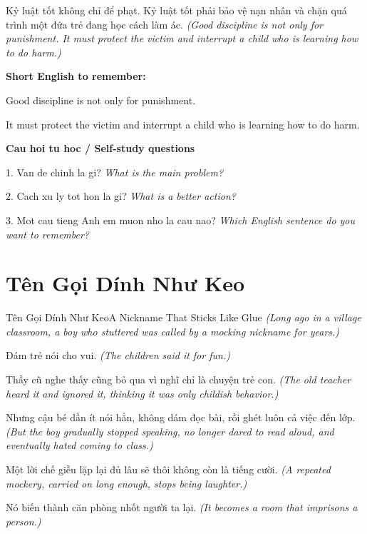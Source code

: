 \begin{baihoc}
Kỷ luật tốt không chỉ để phạt. Kỷ luật tốt phải bảo vệ nạn nhân và chặn quá trình một đứa trẻ đang học cách làm ác.
\textit{(Good discipline is not only for punishment. It must protect the victim and interrupt a child who is learning how to do harm.)}
\end{baihoc}

\begin{ghinhoanh}
\textbf{Short English to remember:}

Good discipline is not only for punishment.

It must protect the victim and interrupt a child who is learning how to do harm.

\end{ghinhoanh}

\begin{tuhocnhanh}
\textbf{Cau hoi tu hoc / Self-study questions}

1. Van de chinh la gi? \textit{What is the main problem?}

2. Cach xu ly tot hon la gi? \textit{What is a better action?}

3. Mot cau tieng Anh em muon nho la cau nao? \textit{Which English sentence do you want to remember?}
\end{tuhocnhanh}
\ngancach

\section{Tên Gọi Dính Như Keo}
\begin{truyen}{Tên Gọi Dính Như Keo}{A Nickname That Sticks Like Glue}
\textit{(Long ago in a village classroom, a boy who stuttered was called by a mocking nickname for years.)}

Đám trẻ nói cho vui.
\textit{(The children said it for fun.)}

Thầy cũ nghe thấy cũng bỏ qua vì nghĩ chỉ là chuyện trẻ con.
\textit{(The old teacher heard it and ignored it, thinking it was only childish behavior.)}

Nhưng cậu bé dần ít nói hẳn, không dám đọc bài, rồi ghét luôn cả việc đến lớp.
\textit{(But the boy gradually stopped speaking, no longer dared to read aloud, and eventually hated coming to class.)}

Một lời chế giễu lặp lại đủ lâu sẽ thôi không còn là tiếng cười.
\textit{(A repeated mockery, carried on long enough, stops being laughter.)}

Nó biến thành căn phòng nhốt người ta lại.
\textit{(It becomes a room that imprisons a person.)}

\end{truyen}

